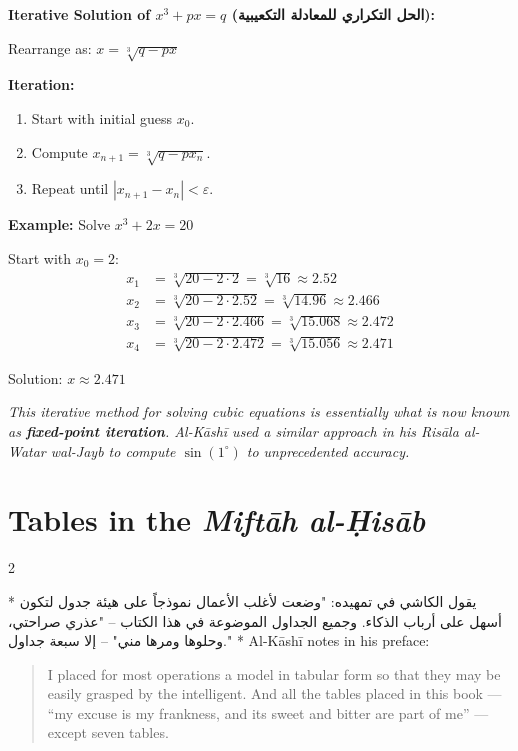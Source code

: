 \documentclass[11pt,a4paper]{article}
\newcommand{\cnote}[1]{\textcolor{notecolor}{\textit{#1}}}
\newcommand{\ar}[1]{{\arabicfont\beginR #1\endR}}
\newenvironment{bilingual}{%
  \vspace{0.3em}%
  \begin{paracol}{2}%
}{%
  \end{paracol}%
  \vspace{0.3em}%
}
\newenvironment{mathalgo}{%
  \par\vspace{0.3cm}
  \begin{framed}
  \setlength{\parindent}{0pt}
}{%
  \end{framed}
  \par\vspace{0.3cm}
}
\begin{document}
\begin{mathalgo}
\textbf{Iterative Solution of $x^3 + px = q$ (\ar{الحل التكراري للمعادلة التكعيبية}):}

Rearrange as: $x = \sqrt[3]{q - px}$

\textbf{Iteration:}
\begin{enumerate}[nosep]
  \item Start with initial guess $x_0$.
  \item Compute $x_{n+1} = \sqrt[3]{q - p x_n}$.
  \item Repeat until $|x_{n+1} - x_n| < \varepsilon$.
\end{enumerate}

\textbf{Example:} Solve $x^3 + 2x = 20$

Start with $x_0 = 2$:
\begin{align*}
x_1 &= \sqrt[3]{20 - 2 \cdot 2} = \sqrt[3]{16} \approx 2.52 \\
x_2 &= \sqrt[3]{20 - 2 \cdot 2.52} = \sqrt[3]{14.96} \approx 2.466 \\
x_3 &= \sqrt[3]{20 - 2 \cdot 2.466} = \sqrt[3]{15.068} \approx 2.472 \\
x_4 &= \sqrt[3]{20 - 2 \cdot 2.472} = \sqrt[3]{15.056} \approx 2.471
\end{align*}

Solution: $\boxed{x \approx 2.471}$
\end{mathalgo}

\cnote{This iterative method for solving cubic equations is essentially
what is now known as \textbf{fixed-point iteration}. Al-K\=ash\=i used a
similar approach in his \textit{Ris\=ala al-Watar wal-Jayb} to compute
$\sin(1^\circ)$ to unprecedented accuracy.}
\clearpage

\section{Tables in the \textit{Mift\=ah al-\d{H}is\=ab}}
\label{sec:tables}

\begin{bilingual}
\switchcolumn[0]*
\ar{يقول الكاشي في تمهيده: "وضعت لأغلب الأعمال نموذجاً على هيئة جدول لتكون أسهل على أرباب الذكاء. وجميع الجداول الموضوعة في هذا الكتاب -- "عذري صراحتي، وحلوها ومرها مني" -- إلا سبعة جداول."}
\switchcolumn[1]*
Al-K\=ash\=i notes in his preface:
\begin{quote}
I placed for most operations a model in tabular form so that they may
be easily grasped by the intelligent. And all the tables placed in
this book --- ``my excuse is my frankness, and its sweet and bitter
are part of me'' --- except seven tables.
\end{quote}
\end{bilingual}
\end{document}
